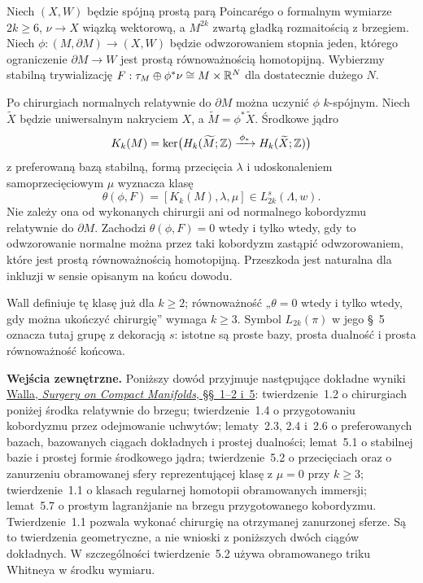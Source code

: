 \begin{twierdzenie}
\label{thm:Wall-parzyste-pelne-22}
Niech $(X,W)$ będzie spójną prostą parą Poincarégo o formalnym
wymiarze $2k\geq6$, $\nu\to X$ wiązką wektorową, a $M^{2k}$
zwartą gładką rozmaitością z brzegiem. Niech
$\phi:(M,\partial M)\to(X,W)$ będzie odwzorowaniem stopnia jeden,
którego ograniczenie $\partial M\to W$ jest prostą równoważnością
homotopijną. Wybierzmy stabilną trywializację
$F:\tau_M\oplus\phi^*\nu\cong M\times\mathbb{R}^N$ dla dostatecznie
dużego $N$.

Po chirurgiach normalnych relatywnie do $\partial M$ można
uczynić $\phi$ $k$-spójnym. Niech $\widetilde X$ będzie
uniwersalnym nakryciem $X$, a $\widetilde M=\phi^*\widetilde X$.
Środkowe jądro
\[
 K_k(M)=\ker\bigl(H_k(\widetilde M;\mathbb{Z})
                \xrightarrow{\,\phi_*\,}H_k(\widetilde X;\mathbb{Z})\bigr)
\]
z preferowaną bazą stabilną, formą przecięcia $\lambda$
i udoskonaleniem samoprzecięciowym $\mu$ wyznacza klasę
\[
 \theta(\phi,F)=[K_k(M),\lambda,\mu]
       \in L^s_{2k}(\Lambda,w).
\]
Nie zależy ona od wykonanych chirurgii ani od normalnego
kobordyzmu relatywnie do $\partial M$. Zachodzi
$\theta(\phi,F)=0$ wtedy i tylko wtedy, gdy to odwzorowanie normalne
można przez taki kobordyzm zastąpić odwzorowaniem, które jest prostą
równoważnością homotopijną. Przeszkoda jest naturalna dla
inkluzji w sensie opisanym na końcu dowodu.
\end{twierdzenie}

Wall definiuje tę klasę już dla $k\geq2$; równoważność
„$\theta=0$ wtedy i tylko wtedy, gdy można ukończyć chirurgię”
wymaga $k\geq3$. Symbol $L_{2k}(\pi)$ w jego §~5 oznacza tutaj
grupę z dekoracją $s$: istotne są proste bazy, prosta dualność
i prosta równoważność końcowa.

\noindent\textbf{Wejścia zewnętrzne.}
Poniższy dowód przyjmuje następujące dokładne wyniki
\href{https://www.maths.ed.ac.uk/~v1ranick/books/scm.pdf}
{Walla, \emph{Surgery on Compact Manifolds}, §§~1--2 i~5}:
twierdzenie~1.2 o chirurgiach poniżej środka relatywnie do
brzegu; twierdzenie~1.4 o przygotowaniu kobordyzmu przez
odejmowanie uchwytów; lematy~2.3, 2.4 i~2.6 o preferowanych
bazach, bazowanych ciągach dokładnych i prostej dualności;
lemat~5.1 o stabilnej bazie i prostej formie środkowego jądra;
twierdzenie~5.2 o przecięciach oraz o zanurzeniu obramowanej
sfery reprezentującej klasę z $\mu=0$ przy $k\geq3$;
twierdzenie~1.1 o klasach regularnej homotopii
obramowanych immersji;
lemat~5.7 o prostym lagranżjanie na brzegu przygotowanego
kobordyzmu. Twierdzenie~1.1 pozwala wykonać chirurgię
na otrzymanej zanurzonej sferze. Są to twierdzenia
geometryczne, a nie wnioski z poniższych dwóch ciągów
dokładnych. W szczególności twierdzenie~5.2 używa
obramowanego triku Whitneya w środku wymiaru.

